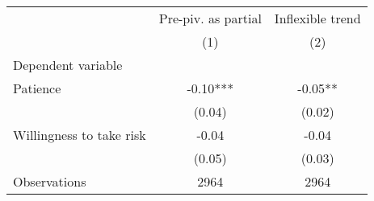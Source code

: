 \begin{tabular}{lcc}%
    \hline%
    \hline%
    &Pre-piv. as partial&Inflexible trend\\%
    &(1)&(2)\\%
    \hline%
    Dependent variable&&\\%
    Patience&{-}0.10***&{-}0.05**\\%
    &(0.04)&(0.02)\\%
    Willingness to take risk&{-}0.04&{-}0.04\\%
    &(0.05)&(0.03)\\%
    \hline%
    Observations&2964&2964\\%
    \hline%
    \hline%
\end{tabular}
